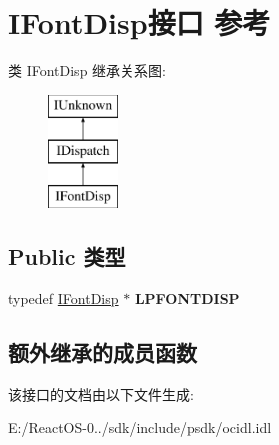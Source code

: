 \hypertarget{interface_i_font_disp}{}\section{I\+Font\+Disp接口 参考}
\label{interface_i_font_disp}
类 I\+Font\+Disp 继承关系图\+:\begin{figure}[H]
\begin{center}
\leavevmode
\includegraphics[height=3.000000cm]{interface_i_font_disp}
\end{center}
\end{figure}
\subsection*{Public 类型}
\begin{DoxyCompactItemize}
\item 
\mbox{\label{interface_i_font_disp_a230cc20048ef0f60749fbd40c512e806}} 
typedef \hyperlink{interface_i_font_disp}{I\+Font\+Disp} $\ast$ {\bfseries L\+P\+F\+O\+N\+T\+D\+I\+SP}
\end{DoxyCompactItemize}
\subsection*{额外继承的成员函数}


该接口的文档由以下文件生成\+:\begin{DoxyCompactItemize}
\item 
E\+:/\+React\+O\+S-\/0../sdk/include/psdk/ocidl.\+idl\end{DoxyCompactItemize}
